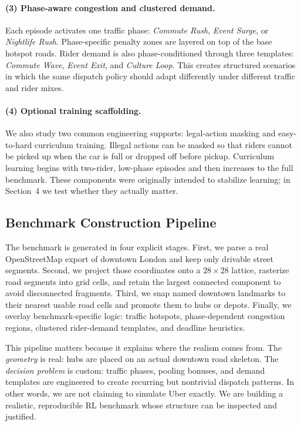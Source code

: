 \documentclass{article}
\begin{document}
\paragraph{(3) Phase-aware congestion and clustered demand.}
Each episode activates one traffic phase: \emph{Commute Rush}, \emph{Event Surge}, or \emph{Nightlife Rush}. Phase-specific penalty zones are layered on top of the base hotspot roads. Rider demand is also phase-conditioned through three templates: \emph{Commute Wave}, \emph{Event Exit}, and \emph{Culture Loop}. This creates structured scenarios in which the same dispatch policy should adapt differently under different traffic and rider mixes.

\paragraph{(4) Optional training scaffolding.}
We also study two common engineering supports: legal-action masking and easy-to-hard curriculum training. Illegal actions can be masked so that riders cannot be picked up when the car is full or dropped off before pickup. Curriculum learning begins with two-rider, low-phase episodes and then increases to the full benchmark. These components were originally intended to stabilize learning; in Section~4 we test whether they actually matter.

\subsection{Benchmark Construction Pipeline}
The benchmark is generated in four explicit stages. First, we parse a real OpenStreetMap export of downtown London and keep only drivable street segments. Second, we project those coordinates onto a \(28 \times 28\) lattice, rasterize road segments into grid cells, and retain the largest connected component to avoid disconnected fragments. Third, we snap named downtown landmarks to their nearest usable road cells and promote them to hubs or depots. Finally, we overlay benchmark-specific logic: traffic hotspots, phase-dependent congestion regions, clustered rider-demand templates, and deadline heuristics.

This pipeline matters because it explains where the realism comes from. The \emph{geometry} is real: hubs are placed on an actual downtown road skeleton. The \emph{decision problem} is custom: traffic phases, pooling bonuses, and demand templates are engineered to create recurring but nontrivial dispatch patterns. In other words, we are not claiming to simulate Uber exactly. We are building a realistic, reproducible RL benchmark whose structure can be inspected and justified.
\end{document}
